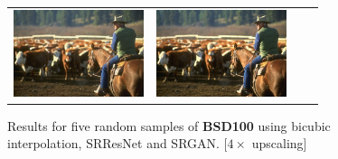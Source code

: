 \documentclass[10pt,twocolumn,letterpaper]{article}
\begin{document}
\begin{figure}[h!]
\begin{tabular}{cccc}
\includegraphics[width=1.5in]{images/used/appendix/jpg/BSD100/220075_SRGAN-VGG54} &
\includegraphics[width=1.5in]{images/used/appendix/jpg/BSD100/220075_HR} \\
\end{tabular}
\label{fig:app_BSD100}
\caption{Results for five random samples of \textbf{BSD100} using bicubic interpolation, SRResNet and SRGAN. [$4\times$ upscaling]}
\end{figure}
\end{document}
